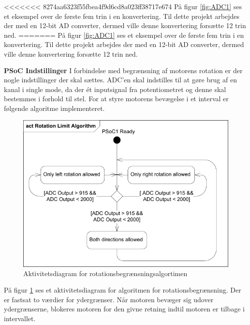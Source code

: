 <<<<<<< 8274aa6323f55fbea4f9d6cd8a023ff38717e674
\noindent På figur \ref{fig:ADC1} ses et eksempel over de første fem trin i en konvertering. Til dette projekt arbejdes der med en 12-bit AD converter, dermed ville denne konvertering forsætte 12 trin ned.  \newline
=======
\noindent På figur \ref{fig:ADC1} ses et eksempel over de første fem trin i en konvertering. Til dette projekt arbejdes der med en 12-bit AD converter, dermed ville denne konvertering forsætte 12 trin ned.  \newline

\noindent \textbf{PSoC Indstillinger} \newline
I forbindelse med begrænsning af motorens rotation er der nogle indstillinger der skal sættes. ADC'en skal indstilles til at gøre brug af en kanal i single mode, da der ét inputsignal fra potentiometret og denne skal bestemmes i forhold til stel. For at styre motorens bevægelse i et interval er følgende algoritme implementeret.

\begin{figure}[H]
	\centering
	\includegraphics[width=\textwidth]{DesignOgImplementering/images/rotationalgorithm}
	\caption{Aktivitetsdiagram for rotationsbegrænsningsalgortimen}
	\label{fig:rotation}
\end{figure}

\noindent På figur \ref{fig:rotation} ses et aktivitetsdiagram for algoritmen for rotationsbegrænsning. Der er fastsat to værdier for ydergrænser. Når motoren bevæger sig udover ydergrænserne, blokeres motoren for den givne retning indtil motoren er tilbage i intervallet. 

